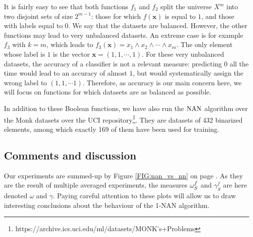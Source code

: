 It is fairly easy to see that both functions $f_1$ and $f_2$ split the universe $X^m$ into
two disjoint sets of size $2^{m - 1}$: those for which $f(\mathbf{x})$ is
equal to $1$, and those with labels equal to $0$. We say that the datasets are
balanced. However, the other functions may lead to very unbalanced datasets. An
extreme case is for example $f_3$ with $k = m$, which leads to $f_3(\mathbf{x})
= x_1 \wedge x_2 \wedge \cdots \wedge x_m$. The only element whose label is $1$
is the vector $\mathbf{x} = (1, 1, \cdots, 1)$. For these very unbalanced
datasets, the accuracy of a classifier is not a relevant measure: predicting
$0$ all the time would lead to an accuracy of almost $1$, but would
systematically assign the wrong label to   $(1, 1, \cdots 1)$. Therefore, as
accuracy is our main concern here, we will focus on functions for which
datasets are as balanced as possible.

In addition to these Boolean functions, we have also run the $\mbox{NAN}$ algorithm
over the Monk datasets over the UCI
repository\footnote{https://archive.ics.uci.edu/ml/datasets/MONK's+Problems}.
They are datasets of 432 binarized elements, among which exactly 169 of them
have been used for training.

\subsection{Comments and discussion}

Our experiments are summed-up by Figure \ref{FIG:nan_vs_nn} on page
\pageref{FIG:nan_vs_nn}. As they are the result of multiple averaged
experiments, the measures $\omega_{S}^{f}$ and $\gamma_S^f$ are here denoted $\omega$
and $\gamma$. Paying careful attention to these plots will allow us to draw
interesting conclusions about the behaviour of the 1-NAN algorithm.

